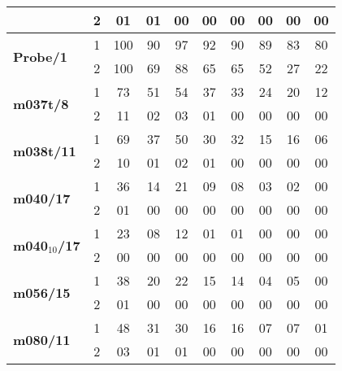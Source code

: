 \begin{tabular}{lccccccccc}
& 2   & 01  & 01  & 00  & 00  & 00  & 00  & 00  & 00 \\ 
\midrule
\multirow{2}{*}{ \bf Probe/1}
& 1   & 100  & 90  & 97  & 92  & 90  & 89  & 83  & 80 \\ 
& 2   & 100  & 69  & 88  & 65  & 65  & 52  & 27  & 22 \\ 
\midrule
\multirow{2}{*}{ \bf m037t/8}
& 1   & 73  & 51  & 54  & 37  & 33  & 24  & 20  & 12 \\ 
& 2   & 11  & 02  & 03  & 01  & 00  & 00  & 00  & 00 \\ 
\midrule
\multirow{2}{*}{ \bf m038t/11}
& 1   & 69  & 37  & 50  & 30  & 32  & 15  & 16  & 06 \\ 
& 2   & 10  & 01  & 02  & 01  & 00  & 00  & 00  & 00 \\ 
\midrule
\multirow{2}{*}{ \bf m040/17}
& 1   & 36  & 14  & 21  & 09  & 08  & 03  & 02  & 00 \\ 
& 2   & 01  & 00  & 00  & 00  & 00  & 00  & 00  & 00 \\ 
\midrule
\multirow{2}{*}{ \bf m040$_{10}$/17}
& 1   & 23  & 08  & 12  & 01  & 01  & 00  & 00  & 00 \\ 
& 2   & 00  & 00  & 00  & 00  & 00  & 00  & 00  & 00 \\ 
\midrule
\multirow{2}{*}{ \bf m056/15}
& 1   & 38  & 20  & 22  & 15  & 14  & 04  & 05  & 00 \\ 
& 2   & 01  & 00  & 00  & 00  & 00  & 00  & 00  & 00 \\ 
\midrule
\multirow{2}{*}{ \bf m080/11}
& 1   & 48  & 31  & 30  & 16  & 16  & 07  & 07  & 01 \\ 
& 2   & 03  & 01  & 01  & 00  & 00  & 00  & 00  & 00 \\ 
\bottomrule
\end{tabular}
